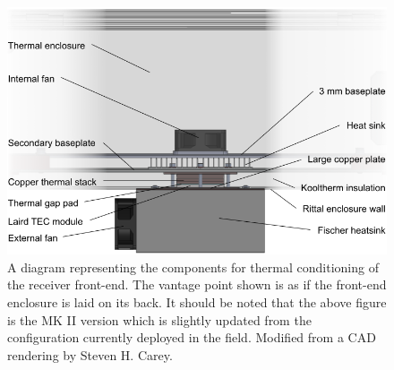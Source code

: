 \begin{figure}
    \centering
    \includegraphics[width=\textwidth]{reach_peltier_diagram}
    \caption{A diagram representing the components for thermal conditioning of the receiver front-end. The vantage point shown is as if the front-end enclosure is laid on its back. It should be noted that the above figure is the MK II version which is slightly updated from the configuration currently deployed in the field. Modified from a CAD rendering by Steven H. Carey.}
    \label{fig:peltier_diag}
\end{figure}

